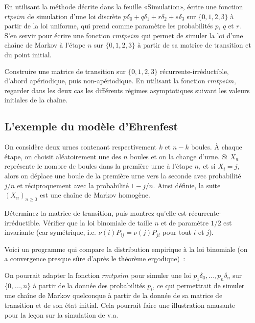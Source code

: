 {{\begin{exo}
  En utilisant la méthode décrite dans la feuille «Simulation», écrire une
  fonction \ML{} $rtpsim$ de simulation d'une loi discrète
  $p\delta_0+q\delta_1+r\delta_2+s\delta_3$ sur $\{0,1,2,3\}$ à partir de la loi uniforme, qui prend
  comme paramètre les probabilités $p$, $q$ et $r$.  S'en servir pour écrire
  une fonction $rmtpsim$ qui permet de simuler la loi d'une chaîne de Markov à
  l'étape $n$ sur $\{0,1,2,3\}$ à partir de sa matrice de transition et du point
  initial.
\end{exo}

\begin{exo}
  Construire une matrice de transition sur $\{0,1,2,3\}$
  récurrente-irréductible, d'abord apériodique, puis non-apériodique. En
  utilisant la fonction $rmtpsim$, regarder dans les deux cas les différents
  régimes asymptotiques suivant les valeurs initiales de la chaîne.
\end{exo}


%
\subsection{L'exemple du modèle d'Ehrenfest}
%

On considère deux urnes contenant respectivement $k$ et $n-k$ boules. À
chaque étape, on choisit aléatoirement une des $n$ boules et on la change
d'urne. Si $X_n$ représente le nombre de boules dans la première urne à
l'étape $n$, et si $X_i=j$, alors on déplace une boule de la première urne
vers la seconde avec probabilité $j/n$ et réciproquement avec la probabilité
$1-j/n$. Ainsi définie, la suite $(X_n)_{n\geq 0}$ est une chaîne de Markov
homogène. 

Déterminez la matrice de transition, puis montrez qu'elle est
récurrente-irréductible. Vérifier que la loi binomiale de taille $n$ et de
paramètre $1/2$ est invariante (car symétrique, i.e. $\nu(i) P_{ij} = \nu(j)
P_{ji}$ pour tout $i$ et $j$). 
 
Voici un programme \ML{} qui compare la distribution empirique à la loi
binomiale (on a convergence presque sûre d'après le théorème ergodique)~:
%
%
%
\begin{exo}
  On pourrait adapter la fonction $rmtpsim$ pour simuler une loi
  $p_1\delta_0,\ldots,p_n\delta_n$ sur $\{0,\ldots,n\}$ à partir de la donnée
  des probabilités $p_i$, ce qui permettrait de simuler une chaîne de Markov
  quelconque à partir de la donnée de sa matrice de transition et de son état
  initial. Cela pourrait faire une illustration amusante pour la leçon sur la
  simulation de v.a.
\end{exo}

}}

